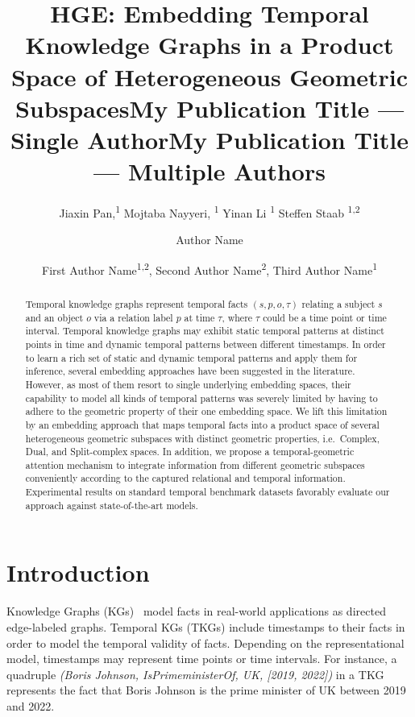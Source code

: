 \documentclass[letterpaper]{article} %
\title{HGE: Embedding Temporal Knowledge Graphs in a Product Space of Heterogeneous Geometric Subspaces}
\author {
    Jiaxin Pan,\textsuperscript{\rm 1}
    Mojtaba Nayyeri, \textsuperscript{\rm 1}
    Yinan Li \textsuperscript{\rm 1}
    Steffen Staab \textsuperscript{\rm 1,2}
}
\title{My Publication Title --- Single Author}
\author {
    Author Name
}
\title{My Publication Title --- Multiple Authors}
\author {
    First Author Name\textsuperscript{\rm 1,\rm 2},
    Second Author Name\textsuperscript{\rm 2},
    Third Author Name\textsuperscript{\rm 1}
}
\begin{document}
\maketitle

\begin{abstract}
Temporal knowledge graphs represent temporal facts $(s,p,o,\tau)$ relating a subject $s$ and an object $o$ via a relation label $p$ at time $\tau$, where $\tau$ could be a time point or time interval. Temporal knowledge graphs may exhibit static temporal patterns at distinct points in time and dynamic temporal patterns between different timestamps. 
In order to learn a rich set of static and dynamic temporal patterns and apply them for inference, several embedding approaches have been suggested in the literature.
However, as most of them resort to single underlying embedding spaces, their capability to model all kinds of temporal patterns was severely limited by having to adhere to the geometric property of their one embedding space. 
We lift this limitation by an embedding approach that maps temporal facts into a product space of several heterogeneous geometric subspaces with distinct geometric properties, i.e.\  Complex,  Dual, and  Split-complex spaces. In addition, we propose a temporal-geometric attention mechanism to integrate information from different geometric subspaces conveniently according to the captured relational and temporal information. 
Experimental results on standard temporal benchmark datasets favorably evaluate our approach against state-of-the-art models.
\end{abstract}

\section{Introduction}
Knowledge Graphs (KGs)~\cite{hogan2021knowledge} model facts in real-world applications as directed edge-labeled graphs. Temporal KGs (TKGs) include timestamps to their facts in order to model the temporal validity of facts. Depending on the representational model, timestamps may represent time points or time intervals. For instance, a quadruple \textit{(Boris Johnson, IsPrimeministerOf, UK, [2019, 2022])} in a TKG represents the fact that Boris Johnson is the prime minister of UK between 2019 and 2022.  
\end{document}
